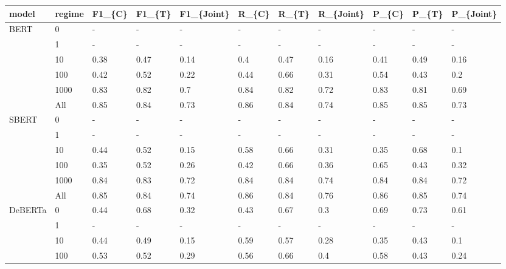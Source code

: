 \begin{table}
\centering\begingroup\fontsize{9}{11}\selectfont

\begin{tabular}[t]{llll>{}l|ll>{}l|lll}
\toprule
model & regime & F1\_\{C\} & F1\_\{T\} & F1\_\{Joint\} & R\_\{C\} & R\_\{T\} & R\_\{Joint\} & P\_\{C\} & P\_\{T\} & P\_\{Joint\}\\
\midrule
BERT & 0 & - & - & - & - & - & - & - & - & -\\

 & 1 & - & - & - & - & - & - & - & - & -\\

 & 10 & 0.38 & 0.47 & 0.14 & 0.4 & 0.47 & 0.16 & 0.41 & 0.49 & 0.16\\

 & 100 & 0.42 & 0.52 & 0.22 & 0.44 & 0.66 & 0.31 & 0.54 & 0.43 & 0.2\\

 & 1000 & 0.83 & 0.82 & 0.7 & 0.84 & 0.82 & 0.72 & 0.83 & 0.81 & 0.69\\

 & All & 0.85 & 0.84 & 0.73 & 0.86 & 0.84 & 0.74 & 0.85 & 0.85 & 0.73\\
\cmidrule{1-11}
SBERT & 0 & - & - & - & - & - & - & - & - & -\\

 & 1 & - & - & - & - & - & - & - & - & -\\

 & 10 & 0.44 & 0.52 & 0.15 & 0.58 & 0.66 & 0.31 & 0.35 & 0.68 & 0.1\\

 & 100 & 0.35 & 0.52 & 0.26 & 0.42 & 0.66 & 0.36 & 0.65 & 0.43 & 0.32\\

 & 1000 & 0.84 & 0.83 & 0.72 & 0.84 & 0.84 & 0.74 & 0.84 & 0.84 & 0.72\\

 & All & 0.85 & 0.84 & 0.74 & 0.86 & 0.84 & 0.76 & 0.86 & 0.85 & 0.74\\
\cmidrule{1-11}
DeBERTa & 0 & 0.44 & 0.68 & 0.32 & 0.43 & 0.67 & 0.3 & 0.69 & 0.73 & 0.61\\

 & 1 & - & - & - & - & - & - & - & - & -\\

 & 10 & 0.44 & 0.49 & 0.15 & 0.59 & 0.57 & 0.28 & 0.35 & 0.43 & 0.1\\

 & 100 & 0.53 & 0.52 & 0.29 & 0.56 & 0.66 & 0.4 & 0.58 & 0.43 & 0.24\\


\end{tabular}
\end{table}
